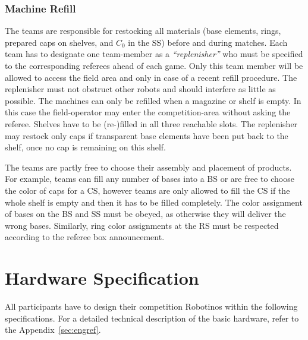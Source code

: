 \documentclass[12pt,twoside]{article}
\begin{document}
\subsubsection{Machine Refill}
\label{sec:machine-refill}
The teams are responsible for restocking all materials (base elements,
rings, prepared caps on shelves, and $C_0$ in the SS) before and during matches.
Each team has to designate one team-member as a \textit{``replenisher''} who
must be specified to the corresponding referees ahead of each
game.  Only this team member will be allowed to access the field area and only
in case of a recent refill procedure.  The replenisher must not obstruct other
robots and should interfere as little as possible.  The machines can only be
refilled when a magazine or shelf is empty. In this case the field-operator may
enter the competition-area without asking the referee. Shelves have to be
(re-)filled in all three reachable slots. %
The replenisher may restock only caps if transparent base elements have been put
back to the shelf, once no cap is remaining on this shelf.

The teams are partly free to choose their assembly and placement of products.
For example, teams can fill any number of bases into a BS or are free to choose
the color of caps for a CS, however teams are only allowed to fill the CS if the
whole shelf is empty and then it has to be filled completely.  The color
assignment of bases on the BS and SS must be obeyed, as otherwise they will
deliver the wrong bases. Similarly, ring color assignments at the RS must be
respected according to the referee box announcement.


\section{Hardware Specification}
\label{sec:robotino}

All participants have to design their competition Robotinos within the
following specifications. For a detailed technical description of the
basic hardware, refer to the Appendix~\ref{sec:engref}.
\end{document}
